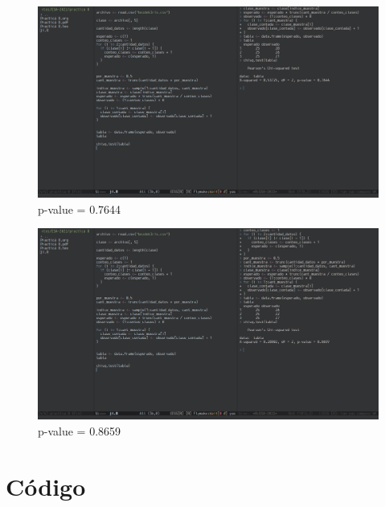 \documentclass[12pt]{article}
\begin{document}
\begin{figure}[htbp]
\centering
\includegraphics[width=.9\linewidth]{img/2.png}
\caption{p-value = 0.7644}
\end{figure}

\begin{figure}[htbp]
\centering
\includegraphics[width=.9\linewidth]{img/3.png}
\caption{p-value = 0.8659}
\end{figure}

\pagebreak

\section*{Código}
\label{sec:org0973077}

\end{document}
